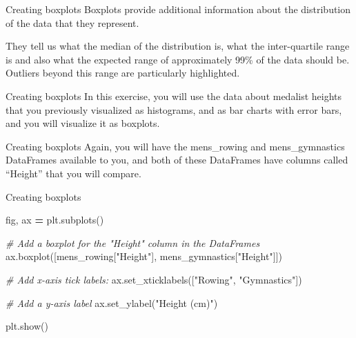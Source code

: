 \documentclass[
  ignorenonframetext,
]{beamer}
\newenvironment{Shaded}{\begin{snugshade}}{\end{snugshade}}
\newcommand{\CommentTok}[1]{\textcolor[rgb]{0.56,0.35,0.01}{\textit{#1}}}
\newcommand{\NormalTok}[1]{#1}
\newcommand{\OperatorTok}[1]{\textcolor[rgb]{0.81,0.36,0.00}{\textbf{#1}}}
\newcommand{\StringTok}[1]{\textcolor[rgb]{0.31,0.60,0.02}{#1}}
\begin{document}
\begin{frame}{Creating boxplots}
\label{creating-boxplots}
Boxplots provide additional information about the distribution of the
data that they represent.

They tell us what the median of the distribution is, what the
inter-quartile range is and also what the expected range of
approximately 99\% of the data should be. Outliers beyond this range are
particularly highlighted.
\end{frame}

\begin{frame}{Creating boxplots}
\label{creating-boxplots-1}
In this exercise, you will use the data about medalist heights that you
previously visualized as histograms, and as bar charts with error bars,
and you will visualize it as boxplots.
\end{frame}

\begin{frame}{Creating boxplots}
\label{creating-boxplots-2}
Again, you will have the mens\_rowing and mens\_gymnastics DataFrames
available to you, and both of these DataFrames have columns called
``Height'' that you will compare.
\end{frame}

\begin{frame}[fragile]{Creating boxplots}
\label{creating-boxplots-3}

\begin{Shaded}
\begin{Highlighting}[]
\NormalTok{fig, ax }\OperatorTok{=}\NormalTok{ plt.subplots()}

\CommentTok{\# Add a boxplot for the "Height" column in the DataFrames}
\NormalTok{ax.boxplot([mens\_rowing[}\StringTok{"Height"}\NormalTok{], mens\_gymnastics[}\StringTok{"Height"}\NormalTok{]])}

\CommentTok{\# Add x{-}axis tick labels:}
\NormalTok{ax.set\_xticklabels([}\StringTok{"Rowing"}\NormalTok{, }\StringTok{"Gymnastics"}\NormalTok{])}

\CommentTok{\# Add a y{-}axis label}
\NormalTok{ax.set\_ylabel(}\StringTok{"Height (cm)"}\NormalTok{)}

\NormalTok{plt.show()}
\end{Highlighting}
\end{Shaded}
\end{frame}
\end{document}
